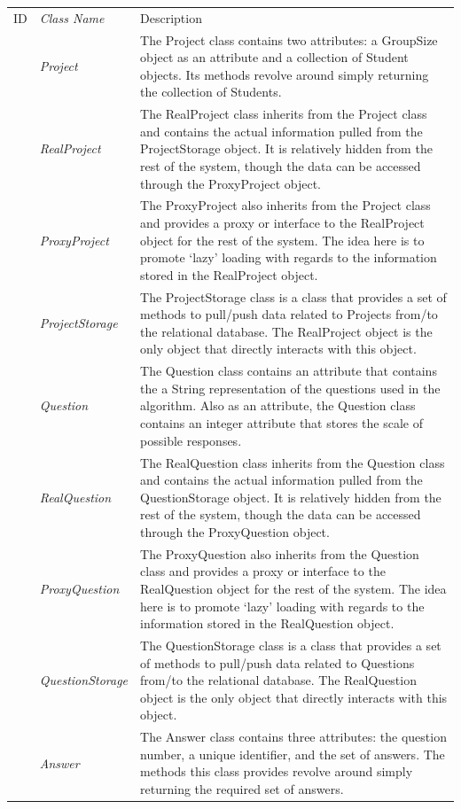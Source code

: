\documentclass[12pt,letterpaper]{article}
\begin{document}
\begin{center}
\begin{tabu} to 
	\tableheader{}ID & Class Name & Description \\
	 & Project & The Project class contains two attributes: a GroupSize object as an attribute and a collection of Student objects. Its methods revolve around simply returning the collection of Students.\\
	 & RealProject & The RealProject class inherits from the Project class and contains the actual information pulled from the ProjectStorage object. It is relatively hidden from the rest of the system, though the data can be accessed through the ProxyProject object.\\
	 & ProxyProject & The ProxyProject also inherits from the Project class and provides a proxy or interface to the RealProject object for the rest of the system. The idea here is to promote `lazy' loading with regards to the information stored in the RealProject object.\\
	 & ProjectStorage & The ProjectStorage class is a class that provides a set of methods to pull/push data related to Projects from/to the relational database. The RealProject object is the only object that directly interacts with this object.\\
	 & Question & The Question class contains an attribute that contains the a String representation of the questions used in the algorithm. Also as an attribute, the Question class contains an integer attribute that stores the scale of possible responses. \\
	 & RealQuestion & The RealQuestion class inherits from the Question class and contains the actual information pulled from the QuestionStorage object. It is relatively hidden from the rest of the system, though the data can be accessed through the ProxyQuestion object.\\
	 & ProxyQuestion & The ProxyQuestion also inherits from the Question class and provides a proxy or interface to the RealQuestion object for the rest of the system. The idea here is to promote `lazy' loading with regards to the information stored in the RealQuestion object.\\
	 & QuestionStorage & The QuestionStorage class is a class that provides a set of methods to pull/push data related to Questions from/to the relational database. The RealQuestion object is the only object that directly interacts with this object.\\
	 & Answer & The Answer class contains three attributes: the question number, a unique identifier, and the set of answers. The methods this class provides revolve around simply returning the required set of answers.\\
\end{tabu}
\end{center}
\end{document}
